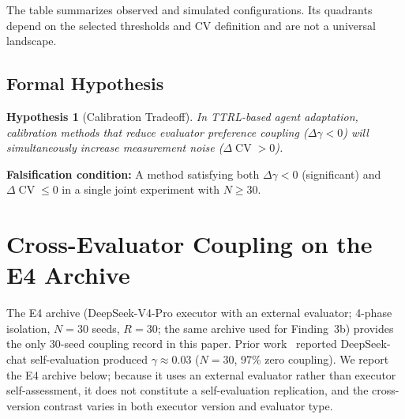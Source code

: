 \documentclass[11pt]{article}
\DeclareMathOperator{\CV}{CV}
\newtheorem{hypothesis}{Hypothesis}
\begin{document}
The table summarizes observed and simulated configurations. Its quadrants depend on the selected thresholds and CV definition and are not a universal landscape.

\subsection{Formal Hypothesis}

\begin{hypothesis}[Calibration Tradeoff]
In TTRL-based agent adaptation, calibration methods that reduce evaluator preference coupling ($\Delta\gamma < 0$) will simultaneously increase measurement noise ($\Delta\CV > 0$).
\end{hypothesis}

\textbf{Falsification condition:} A method satisfying both $\Delta\gamma < 0$ (significant) and $\Delta\CV \leq 0$ in a single joint experiment with $N \geq 30$.


\section{Cross-Evaluator Coupling on the E4 Archive}

The E4 archive (DeepSeek-V4-Pro executor with an external evaluator; 4-phase isolation, $N{=}30$ seeds, $R{=}30$; the same archive used for Finding~3b) provides the only 30-seed coupling record in this paper. Prior work~\citep{epc2026} reported DeepSeek-chat self-evaluation produced $\gamma \approx 0.03$ ($N{=}30$, 97\% zero coupling). We report the E4 archive below; because it uses an external evaluator rather than executor self-assessment, it does not constitute a self-evaluation replication, and the cross-version contrast varies in both executor version and evaluator type.
\end{document}
